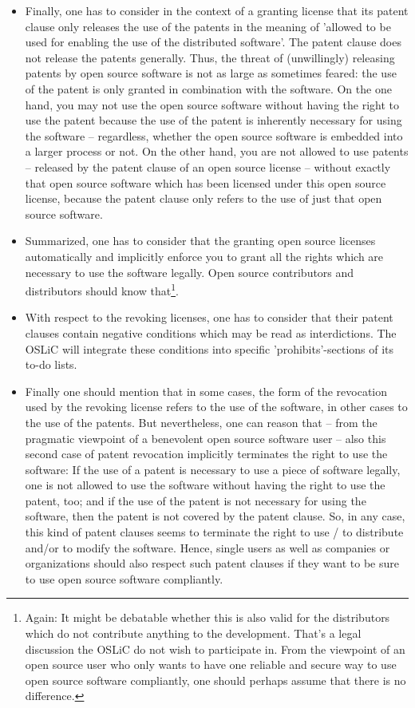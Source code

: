 \begin{itemize}
  \item Finally, one has to consider in the context of a granting license that
  its patent clause only releases the use of the patents in the meaning of
  'allowed to be used for enabling the use of the distributed software'. The
  patent clause does not release the patents generally. Thus, the threat of
  (unwillingly) releasing patents by open source software is not as large as
  sometimes feared: the use of the patent is only granted in combination with
  the software. On the one hand, you may not use the open source software
  without having the right to use the patent because the use of the patent is
  inherently necessary for using the software -- regardless, whether the open
  source software is embedded into a larger process or not. On the other hand,
  you are not allowed to use patents -- released by the patent clause of an open
  source license -- without exactly that open source software which has been
  licensed under this open source license, because the patent clause only refers
  to the use of just that open source software.

  \item Summarized, one has to consider that the granting open source licenses
  automatically and implicitly enforce you to grant all the rights which are
  necessary to use the software legally. Open source contributors and
  distributors should know that\footnote{Again: It might be debatable whether
  this is also valid for the distributors which do not contribute anything to
  the development. That's a legal discussion the OSLiC do not wish to participate
  in. From the viewpoint of an open source user who only wants to have one
  reliable and secure way to use open source software compliantly, one should
  perhaps assume that there is no difference.}.

  \item With respect to the revoking licenses, one has to consider that their
  patent clauses contain negative conditions which may be read as interdictions.
  The OSLiC will integrate these conditions into specific 'prohibits'-sections
  of its to-do lists.
  
  \item Finally one should mention that in some cases, the form of the
  revocation used by the revoking license refers to the use of the software, in
  other cases to the use of the patents. But nevertheless, one can reason that
  -- from the pragmatic viewpoint of a benevolent open source software user --
  also this second case of patent revocation implicitly terminates the right to
  use the software: If the use of a patent is necessary to use a piece of
  software legally, one is not allowed to use the software without having the
  right to use the patent, too; and if the use of the patent is not necessary
  for using the software, then the patent is not covered by the patent clause.
  So, in any case, this kind of patent clauses seems to terminate the right to
  use / to distribute and/or to modify the software. Hence, single users as well
  as companies or organizations should also respect such patent clauses if they
  want to be sure to use open source software compliantly.
\end{itemize}

